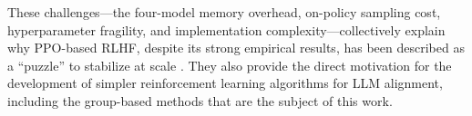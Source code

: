 These challenges---the four-model memory overhead, on-policy sampling cost, hyperparameter fragility, and implementation complexity---collectively explain why PPO-based RLHF, despite its strong empirical results, has been described as a ``puzzle'' to stabilize at scale \cite{zheng2023secrets}. They also provide the direct motivation for the development of simpler reinforcement learning algorithms for LLM alignment, including the group-based methods that are the subject of this work.
